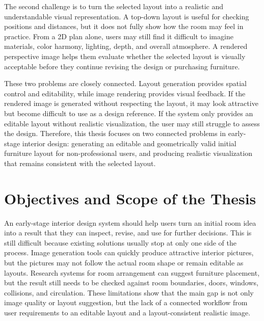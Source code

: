 The second challenge is to turn the selected layout into a realistic and understandable visual representation. A top-down layout is useful for checking positions and distances, but it does not fully show how the room may feel in practice. From a 2D plan alone, users may still find it difficult to imagine materials, color harmony, lighting, depth, and overall atmosphere. A rendered perspective image helps them evaluate whether the selected layout is visually acceptable before they continue revising the design or purchasing furniture.

These two problems are closely connected. Layout generation provides spatial control and editability, while image rendering provides visual feedback. If the rendered image is generated without respecting the layout, it may look attractive but become difficult to use as a design reference. If the system only provides an editable layout without realistic visualization, the user may still struggle to assess the design. Therefore, this thesis focuses on two connected problems in early-stage interior design: generating an editable and geometrically valid initial furniture layout for non-professional users, and producing realistic visualization that remains consistent with the selected layout.

\section{Objectives and Scope of the Thesis}

An early-stage interior design system should help users turn an initial room idea into a result that they can inspect, revise, and use for further decisions. This is still difficult because existing solutions usually stop at only one side of the process.  Image generation tools can quickly produce attractive interior pictures, but the pictures may not follow the actual room shape or remain editable as layouts. Research systems for room arrangement can suggest furniture placement, but the result still needs to be checked against room boundaries, doors, windows, collisions, and circulation. These limitations show that the main gap is not only image quality or layout suggestion, but the lack of a connected workflow from user requirements to an editable layout and a layout-consistent realistic image.

